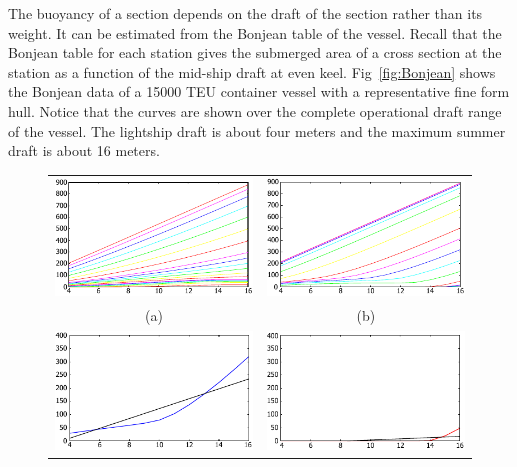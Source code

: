 \documentclass[runningheads]{llncs}
\begin{document}
The buoyancy of a section depends on the draft of the section rather than its weight. It can be estimated from the Bonjean table of the vessel. Recall that the Bonjean table for each station gives the submerged area of a cross section at the station as a function of the mid-ship draft at even keel. Fig~\ref{fig:Bonjean} shows the Bonjean data of a 15000 TEU container vessel with a representative fine form hull. Notice that the curves are shown over the complete operational draft range of the vessel. The lightship draft is about four meters and the maximum summer draft is about 16 meters.
\begin{figure}[h!]
  \begin{tabular}{cc}
 \includegraphics[scale=1]{figures/BonjeanFore} &    \includegraphics[scale=1]{figures/BonjeanAft} \\
          (a)                              &                     (b)   \\
 \includegraphics[scale=1]{figures/BonjeanLinear1} &     \includegraphics[scale=1]{figures/BonjeanLinear2} \\

\end{tabular}
\end{figure}
\end{document}
